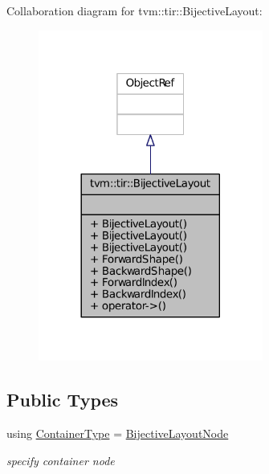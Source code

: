 Collaboration diagram for tvm\+:\+:tir\+:\+:Bijective\+Layout\+:
\nopagebreak
\begin{figure}[H]
\begin{center}
\leavevmode
\includegraphics[width=209pt]{classtvm_1_1tir_1_1BijectiveLayout__coll__graph}
\end{center}
\end{figure}
\subsection*{Public Types}
\begin{DoxyCompactItemize}
\item 
using \hyperlink{classtvm_1_1tir_1_1BijectiveLayout_a0a25c034e42d58d166dc03447369ca8d}{Container\+Type} = \hyperlink{classtvm_1_1tir_1_1BijectiveLayoutNode}{Bijective\+Layout\+Node}
\begin{DoxyCompactList}\small\item\em specify container node \end{DoxyCompactList}\end{DoxyCompactItemize}
